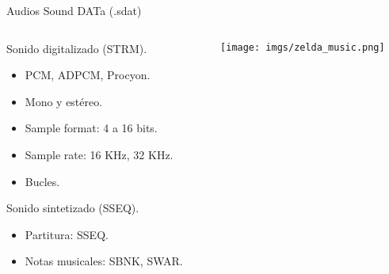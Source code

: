\begin{frame}{Audios}
    \centering{}Sound DATa (.sdat) \\ \vspace{5pt}
    \begin{columns}
    \begin{column}{0.6\textwidth}
        \begin{wideitemize}
            \item<+-> Sonido digitalizado (STRM).
            \begin{itemize}
                \item<+-> PCM, ADPCM, Procyon.
                \item<+-> Mono y estéreo.
                \item<+-> Sample format: 4 a 16 bits.
                \item<+-> Sample rate: 16 KHz, 32 KHz.
                \item<+-> Bucles.
            \end{itemize}
            \item<+-> Sonido sintetizado (SSEQ).
            \begin{itemize}
                \item<+-> Partitura: SSEQ.
                \item<+-> Notas musicales: SBNK, SWAR.
            \end{itemize}
        \end{wideitemize}
    \end{column}
    \begin{column}{0.5\textwidth}
        \texttt{[image: imgs/zelda\_music.png]}
    \end{column}
    \end{columns}
\end{frame}
